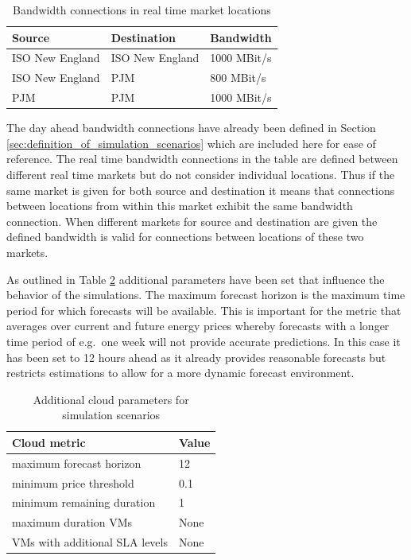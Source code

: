 \begin{table}[htbp]
\centering
\begin{tabular}{lll}
\toprule
	Source & Destination & Bandwidth \\
\midrule
	ISO New England & ISO New England & 1000 MBit/s \\
	ISO New England & PJM & 800 MBit/s \\
	PJM & PJM & 1000 MBit/s \\
\bottomrule
\end{tabular}
\caption{Bandwidth connections in real time market locations}
\label{tab:real_time_bandwidth_mappings}
\end{table}

The day ahead bandwidth connections have already been defined in Section \ref{sec:definition_of_simulation_scenarios} which are included here for ease of reference. The real time bandwidth connections in the table are defined between different real time markets but do not consider individual locations. Thus if the same market is given for both source and destination it means that connections between locations from within this market exhibit the same bandwidth connection. When different markets for source and destination are given the defined bandwidth is valid for connections between locations of these two markets. 

As outlined in Table \ref{tab:additional_cloud_parameters} additional parameters have been set that influence the behavior of the simulations. The maximum forecast horizon is the maximum time period for which forecasts will be available. This is important for the metric that averages over current and future energy prices whereby forecasts with a longer time period of e.g.~one week will not provide accurate predictions. In this case it has been set to 12 hours ahead as it already provides reasonable forecasts but restricts estimations to allow for a more dynamic forecast environment. 

\begin{table}[htbp]
\centering
\begin{tabular}[\textwidth]{ll}
\toprule
	Cloud metric & Value  \\
\midrule
	maximum forecast horizon & 12  \\
	minimum price threshold & 0.1 \\
	minimum remaining duration & 1  \\
	maximum duration VMs & None \\
	VMs with additional SLA levels & None \\
\bottomrule
\end{tabular}
\caption{Additional cloud parameters for simulation scenarios}
\label{tab:additional_cloud_parameters}
\end{table}


